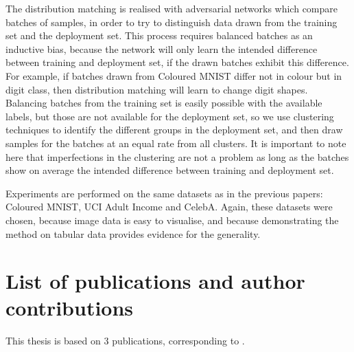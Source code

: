 The distribution matching is realised with adversarial networks which compare batches of samples,
in order to try to distinguish data drawn from the training set and the deployment set.
This process requires balanced batches as an inductive bias,
because the network will only learn the intended difference between training and deployment set,
if the drawn batches exhibit this difference.
For example, if batches drawn from Coloured MNIST differ not in colour but in digit class,
then distribution matching will learn to change digit shapes.
Balancing batches from the training set is easily possible with the available labels,
but those are not available for the deployment set,
so we use clustering techniques to identify the different groups in the deployment set,
and then draw samples for the batches at an equal rate from all clusters.
It is important to note here that imperfections in the clustering are not a problem
as long as the batches show on average the intended difference between training and deployment set.

Experiments are performed on the same datasets as in the previous papers:
Coloured MNIST, UCI Adult Income and CelebA.
Again, these datasets were chosen, because image data is easy to visualise,
and because demonstrating the method on tabular data provides evidence for the generality.

\section{List of publications and author contributions}%
\label{sec:claims-contributions}
This thesis is based on 3 publications, corresponding to .


